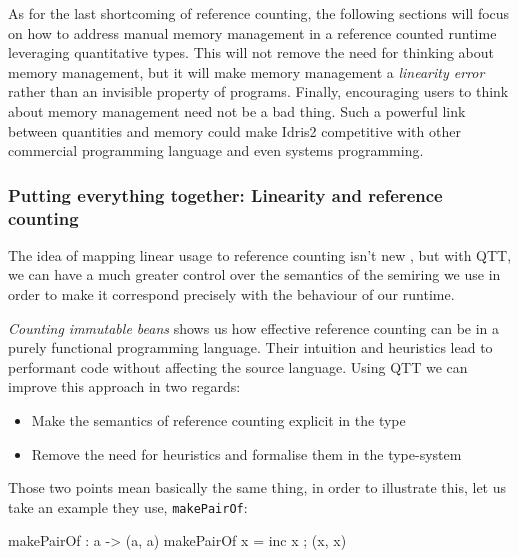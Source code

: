 \documentclass[
]{article}
\newenvironment{Shaded}{}{}
\newcommand{\NormalTok}[1]{#1}
\newcommand{\OperatorTok}[1]{\textcolor[rgb]{0.40,0.40,0.40}{#1}}
\newcommand{\OtherTok}[1]{\textcolor[rgb]{0.00,0.44,0.13}{#1}}
\providecommand{\tightlist}{%
  \setlength{\itemsep}{0pt}\setlength{\parskip}{0pt}}
\begin{document}
As for the last shortcoming of reference counting, the following
sections will focus on how to address manual memory management in a
reference counted runtime leveraging quantitative types. This will not
remove the need for thinking about memory management, but it will make
memory management a \emph{linearity error} rather than an invisible
property of programs. Finally, encouraging users to think about memory
management need not be a bad thing. Such a powerful link between
quantities and memory could make Idris2 competitive with other
commercial programming language and even systems programming.

\hypertarget{putting-everything-together-linearity-and-reference-counting}{%
\subsubsection{Putting everything together: Linearity and reference
counting}\label{putting-everything-together-linearity-and-reference-counting}}

The idea of mapping linear usage to reference counting isn't new
\cite{linear_ref_count}, but with QTT, we can have a much greater
control over the semantics of the semiring we use in order to make it
correspond precisely with the behaviour of our runtime.

\emph{Counting immutable beans}\cite{immutable_beans} shows us how
effective reference counting can be in a purely functional programming
language. Their intuition and heuristics lead to performant code without
affecting the source language. Using QTT we can improve this approach in
two regards:

\begin{itemize}
\tightlist
\item
  Make the semantics of reference counting explicit in the type
\item
  Remove the need for heuristics and formalise them in the type-system
\end{itemize}

Those two points mean basically the same thing, in order to illustrate
this, let us take an example they use, \texttt{makePairOf}:

\begin{Shaded}
\begin{Highlighting}[]
\NormalTok{makePairOf }\OperatorTok{:}\NormalTok{ a }\OtherTok{{-}\textgreater{}}\NormalTok{ (a, a)}
\NormalTok{makePairOf x }\OtherTok{=}\NormalTok{ inc x ; (x, x)}
\end{Highlighting}
\end{Shaded}
\end{document}
